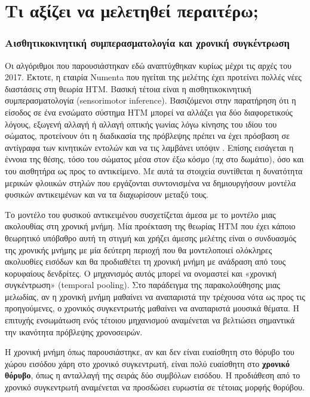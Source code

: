 \section{Τι αξίζει να μελετηθεί περαιτέρω;} \label{conc:study-suggestions}

\subsubsection{Αισθητικοκινητική συμπερασματολογία και χρονική συγκέντρωση}

	Οι αλγόριθμοι που παρουσιάστηκαν εδώ αναπτύχθηκαν κυρίως μέχρι τις αρχές του 2017.
	Έκτοτε, η εταιρία Numenta που ηγείται της μελέτης έχει προτείνει πολλές νέες διαστάσεις στη θεωρία HTM.
	Βασική τέτοια είναι η αισθητικοκινητική συμπερασματολογία (sensorimotor inference).
	Βασιζόμενοι στην παρατήρηση ότι η είσοδος σε ένα ενσώματο σύστημα HTM μπορεί να αλλάζει για δύο διαφορετικούς λόγους,
	εξωγενή αλλαγή ή αλλαγή οπτικής γωνίας λόγω κίνησης του ιδίου του σώματος,
	προτείνουν ότι η διαδικασία της πρόβλεψης πρέπει να έχει πρόσβαση σε αντίγραφα των κινητικών εντολών και να τις λαμβάνει υπόψιν \parencite{hawkinsTheoryHowColumns2017}.
	Επίσης εισάγεται η έννοια της θέσης, τόσο του σώματος μέσα στον έξω κόσμο (πχ στο δωμάτιο), όσο και του αισθητήρα ως προς το αντικείμενο.
	Με αυτά τα στοιχεία συντίθεται η δυνατότητα μερικών φλοιικών στηλών που εργάζονται συντονισμένα να δημιουργήσουν μοντέλα φυσικών αντικειμένων και να τα διαχωρίσουν μεταξύ τους.

	Το μοντέλο του φυσικού αντικειμένου συσχετίζεται άμεσα με το μοντέλο μιας ακολουθίας στη χρονική μνήμη.
	Μία προέκταση της θεωρίας HTM που έχει κάποιο θεωρητικό υπόβαθρο αυτή τη στιγμή και χρήζει άμεσης μελέτης είναι
	ο συνδυασμός της χρονικής μνήμης με μία δεύτερη περιοχή που θα μοντελοποιεί ολόκληρες ακολυοθίες εισόδων
	και θα προδιαθέτει τη χρονική μνήμη με ανάδραση από τους κορυφαίους δενδρίτες.
	Ο μηχανισμός αυτός μπορεί να ονομαστεί και «χρονική συγκέντρωση» (temporal pooling).
	Στο παράδειγμα της παρακολούθησης μιας μελωδίας, αν η χρονική μνήμη μαθαίνει να αναπαριστά την τρέχουσα νότα ως προς τις προηγούμενες,
	ο χρονικός συγκεντρωτής μαθαίνει να αναπαριστά μουσικά θέματα.
	Η επιτυχής ενσωμάτωση ενός τέτοιου μηχανισμού αναμένεται να βελτιώσει σημαντικά την ικανότητα πρόβλεψης χρονοσειρών.

	Η χρονική μνήμη όπως παρουσιάστηκε, αν και δεν είναι ευαίσθητη στο θόρυβο του χώρου εισόδου χάρη στο χρονικό συγκεντρωτή,
	είναι πολύ ευαίσθητη στο \textbf{χρονικό θόρυβο}, όπως η ανταλλαγή της σειράς δύο συμβόλων εισόδου.
	Η προδιάθεση από το χρονικό συγκεντρωτή αναμένεται να προσδώσει ευρωστία σε τέτοιας μορφής θορύβου.

